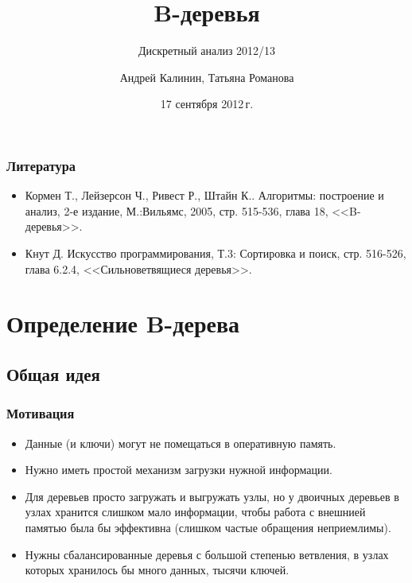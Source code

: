 \documentclass[hyperref={unicode=true}]{beamer}
\title{B-деревья}
\subtitle{Дискретный анализ 2012/13}
\author{Андрей Калинин, Татьяна Романова}
\date{17 сентября 2012\,г. }
\begin{document}
\frame{\titlepage}

\frame{\tableofcontents}

\frame
{
  \frametitle{Литература}

  \begin{itemize}
  \item  Кормен Т., Лейзерсон Ч., Ривест Р., Штайн К.. Алгоритмы:
    построение и анализ, 2-е издание, М.:Вильямс, 2005, стр. 515-536, глава 18,
    <<B-деревья>>. 
  \item  Кнут Д. Искусство программирования, Т.3: Сортировка и поиск,
    стр. 516-526, глава 6.2.4, <<Сильноветвящиеся деревья>>.
  \end{itemize}
}

\section{Определение B-дерева}
\subsection{Общая идея}
\frame
{
  \frametitle{Мотивация}
  \begin{itemize}
    \item Данные (и ключи) могут не помещаться в оперативную память. 
    \item Нужно иметь простой механизм загрузки нужной информации. 
    \item Для деревьев просто загружать и выгружать узлы, но у
      двоичных деревьев в узлах хранится слишком мало информации,
      чтобы работа с внешнией памятью была бы эффективна (слишком
      частые обращения неприемлимы). 
    \item Нужны сбалансированные деревья с большой степенью ветвления,
      в узлах которых хранилось бы много данных, тысячи ключей.  
  \end{itemize}
}


\end{document}
